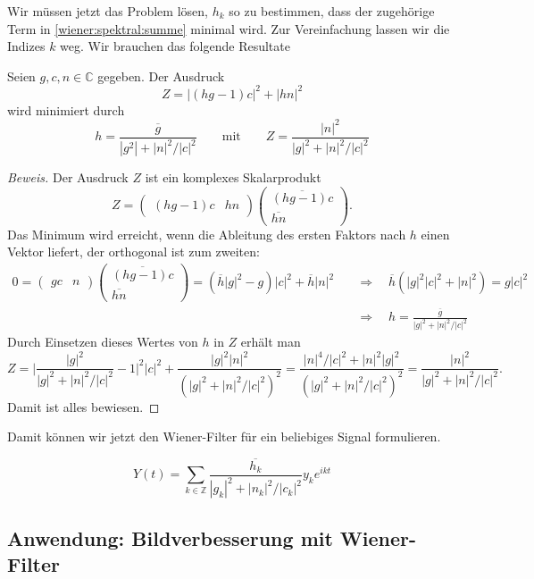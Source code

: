 Wir müssen jetzt das Problem lösen, $h_k$ so zu bestimmen, dass
der zugehörige Term in \eqref{wiener:spektral:summe} minimal wird.
Zur Vereinfachung lassen wir die Indizes $k$ weg.
Wir brauchen das folgende Resultate

\begin{hilfssatz}
Seien $g,c,n\in\mathbb C$ gegeben.
Der Ausdruck
\[
Z = |(hg-1)c|^2 + |hn|^2
\]
wird minimiert durch 
\[
h = \frac{\overline{g}}{|g^2|+|n|^2/|c|^2}
\qquad\text{mit}\qquad
Z = \frac{|n|^2}{|g|^2 + |n|^2/|c|^2}
\]
\end{hilfssatz}

\begin{proof}[Beweis]
Der Ausdruck $Z$ ist ein komplexes Skalarprodukt
\[
Z
=
\begin{pmatrix}
(hg-1)c&hn
\end{pmatrix}
\begin{pmatrix}
\overline{(hg-1)c}\\\overline{hn}
\end{pmatrix}.
\]
Das Minimum wird erreicht, wenn die Ableitung des ersten Faktors nach
$h$ einen Vektor liefert, der orthogonal ist zum zweiten:
\begin{align*}
0
=
\begin{pmatrix}
gc&n
\end{pmatrix}
\begin{pmatrix}
\overline{(hg-1)c}\\\overline{hn}
\end{pmatrix}
=
(\overline{h} |g|^2 - g )|c|^2
+
\overline{h} |n|^2
\quad&\Rightarrow\quad
\overline{h}(|g|^2|c|^2+|n|^2)=g|c|^2
\\
\quad&\Rightarrow\quad
h=\frac{\overline{g}}{|g|^2 + |n|^2/|c|^2}
\end{align*}
Durch Einsetzen dieses Wertes von $h$ in $Z$ erhält man
\[
Z
=
\biggl|
\frac{|g|^2}{|g|^2+|n|^2/|c|^2}
-1
\biggr|^2 |c|^2
+
\frac{|g|^2|n|^2}{(|g|^2+|n|^2/|c|^2)^2}
=
\frac{|n|^4/|c|^2 + |n|^2 |g|^2}{(|g|^2+|n|^2/|c|^2)^2}
=
\frac{|n|^2}{|g|^2+|n|^2/ |c|^2}.
\]
Damit ist alles bewiesen.
\end{proof}

Damit können wir jetzt den Wiener-Filter für ein beliebiges Signal
formulieren.

\begin{satz}
\[
Y(t)
=
\sum_{k\in\mathbb Z}
\frac{\overline{h_k}}{|g_k|^2+|n_k|^2/|c_k|^2} y_k e^{ikt}
\]
\end{satz}

\subsection{Anwendung: Bildverbesserung mit Wiener-Filter
\label{filter:wiener:subsection:bildverbesserung}}


